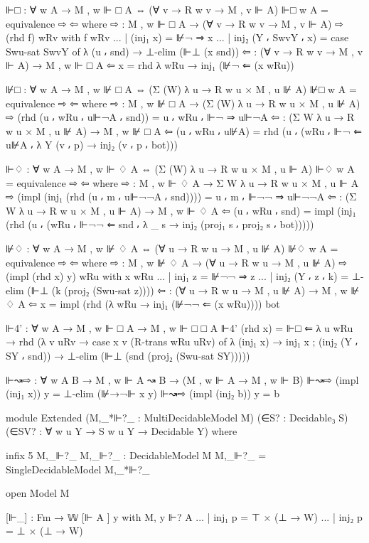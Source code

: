 \begin{spverbatim}
    ⊩□ : ∀ {w A} → M , w ⊩ □ A ⇔ (∀ {v} → R w v → M , v ⊩ A)
    ⊩□ {w} {A} = equivalence ⇨ ⇦
      where
      ⇨ : M , w ⊩ □ A → (∀ {v} → R w v → M , v ⊩ A)
      ⇨ (rhd f) wRv with f wRv
      ... | (inj₁ x) = ⊮¬ ⇒ x
      ... | inj₂ (Y ⸴ SwvY ⸴ x) = case Swu-sat SwvY of
        λ { (u ⸴ snd) → ⊥-elim (⊩⊥ (x snd)) }
      ⇦ : (∀ {v} → R w v → M , v ⊩ A) → M , w ⊩ □ A
      ⇦ x = rhd λ wRu → inj₁ (⊮¬ ⇐ (x wRu))

    ⊮□ : ∀ {w A} → M , w ⊮ □ A ⇔ (Σ (W) λ u → R w u × M , u ⊮ A)
    ⊮□ {w} {A} = equivalence ⇨ ⇦
      where
      ⇨ : M , w ⊮ □ A → (Σ (W) λ u → R w u × M , u ⊮ A)
      ⇨ (rhd (u ⸴ wRu ⸴ u⊩¬A ⸴ snd)) = u ⸴ wRu ⸴ ⊩¬ ⇒ u⊩¬A
      ⇦ : (Σ W λ u → R w u × M , u ⊮ A) → M , w ⊮ □ A
      ⇦ (u ⸴ wRu ⸴ u⊮A) = rhd (u ⸴ (wRu ⸴ ⊩¬ ⇐ u⊮A
        ⸴ λ { Y (v ⸴ p) → inj₂ (v ⸴ p ⸴ bot)}))

    ⊩♢ : ∀  {w A} → M , w ⊩ ♢ A ⇔ (Σ (W) λ u → R w u × M , u ⊩ A)
    ⊩♢ {w} {A} = equivalence ⇨ ⇦
      where
      ⇨ : M , w ⊩ ♢ A → Σ W λ u → R w u × M , u ⊩ A
      ⇨ (impl (inj₁ (rhd (u ⸴ m ⸴ u⊩¬¬A ⸴ snd)))) = u ⸴ m ⸴ ⊩¬¬ ⇒ u⊩¬¬A
      ⇦ : (Σ W λ u → R w u × M , u ⊩ A) → M , w ⊩ ♢ A
      ⇦ (u ⸴ wRu ⸴ snd) = impl (inj₁ (rhd (u ⸴ (wRu ⸴ ⊩¬¬ ⇐ snd ⸴ λ _ s → inj₂ (proj₁ s ⸴ proj₂ s ⸴ bot)))))

    ⊮♢ : ∀ {w A} → M , w ⊮ ♢ A ⇔ (∀ {u} → R w u → M , u ⊮ A)
    ⊮♢ {w} {A} = equivalence ⇨ ⇦
      where
      ⇨ : M , w ⊮ ♢ A → (∀ {u} → R w u → M , u ⊮ A)
      ⇨ (impl (rhd x) y) wRu with x wRu
      ... | inj₁ z = ⊮¬¬ ⇒ z
      ... | inj₂ (Y ⸴ z ⸴ k) = ⊥-elim (⊩⊥ (k (proj₂ (Swu-sat z))))
      ⇦ : (∀ {u} → R w u → M , u ⊮ A) → M , w ⊮ ♢ A
      ⇦ x = impl (rhd (λ wRu → inj₁ (⊮¬¬ ⇐ (x wRu)))) bot

    ⊩4' : ∀ {w A} → M , w ⊩ □ A → M , w ⊩ □ □ A
    ⊩4' (rhd x) = ⊩□ ⇐ λ {u} wRu → rhd (λ {v} uRv →
      case x {v} (R-trans wRu uRv) of λ { (inj₁ x) → inj₁ x
        ; (inj₂ (Y ⸴ SY ⸴ snd)) → ⊥-elim (⊩⊥ (snd (proj₂ (Swu-sat SY))))})

    ⊩↝⇨ : ∀ {w A B} → M , w ⊩ A ↝ B → (M , w ⊩ A → M , w ⊩ B)
    ⊩↝⇨ (impl (inj₁ x)) y = ⊥-elim (⊮→¬⊩ x y)
    ⊩↝⇨ (impl (inj₂ b)) y = b

    module Extended
      (M,_*⊩?_ : MultiDecidableModel M)
      (∈S? : Decidable₃ S)
      (∈SV? : ∀ {w u Y} → S w u Y → Decidable Y) where

      infix 5 M,_⊩?_
      M,_⊩?_ : DecidableModel M
      M,_⊩?_ = SingleDecidableModel M,_*⊩?_

      open Model M

      [⊩_] : Fm → 𝕎
      [⊩ A ] y with M, y ⊩? A
      ... | inj₁ p = ⊤ × (⊥ → W)
      ... | inj₂ p = ⊥ × (⊥ → W)


\end{spverbatim}
